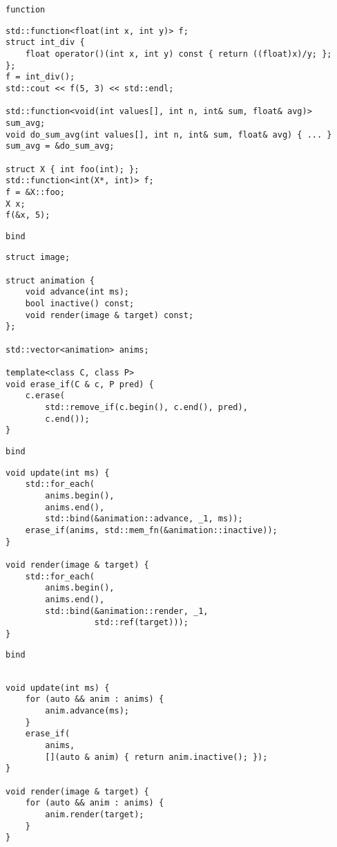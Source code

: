 \documentclass{beamer}
\begin{document}
\begin{frame}[fragile]{{\tt function}}
\small
\begin{lstlisting}
std::function<float(int x, int y)> f;
struct int_div { 
    float operator()(int x, int y) const { return ((float)x)/y; }; 
};
f = int_div();
std::cout << f(5, 3) << std::endl;

std::function<void(int values[], int n, int& sum, float& avg)> sum_avg;
void do_sum_avg(int values[], int n, int& sum, float& avg) { ... }
sum_avg = &do_sum_avg;

struct X { int foo(int); };
std::function<int(X*, int)> f;
f = &X::foo;
X x;
f(&x, 5);
\end{lstlisting}
\end{frame}

\begin{frame}[fragile]{{\tt bind}}
\begin{lstlisting}
struct image;

struct animation {
    void advance(int ms);
    bool inactive() const;
    void render(image & target) const;
};

std::vector<animation> anims;

template<class C, class P>
void erase_if(C & c, P pred) {
    c.erase(
        std::remove_if(c.begin(), c.end(), pred),
        c.end());
}
\end{lstlisting}
\end{frame}

\begin{frame}[fragile]{{\tt bind}}
\begin{lstlisting}
void update(int ms) {
    std::for_each(
        anims.begin(),
        anims.end(), 
        std::bind(&animation::advance, _1, ms));
    erase_if(anims, std::mem_fn(&animation::inactive));
}

void render(image & target) {
    std::for_each(
        anims.begin(),
        anims.end(), 
        std::bind(&animation::render, _1,
                  std::ref(target)));
}
\end{lstlisting}
\end{frame}

\begin{frame}[fragile]{{\tt bind}}
\begin{lstlisting}

void update(int ms) {
    for (auto && anim : anims) {
        anim.advance(ms);
    }
    erase_if(
        anims,
        [](auto & anim) { return anim.inactive(); });
}

void render(image & target) {
    for (auto && anim : anims) {
        anim.render(target);
    }
}
\end{lstlisting}
\end{frame}
\end{document}
